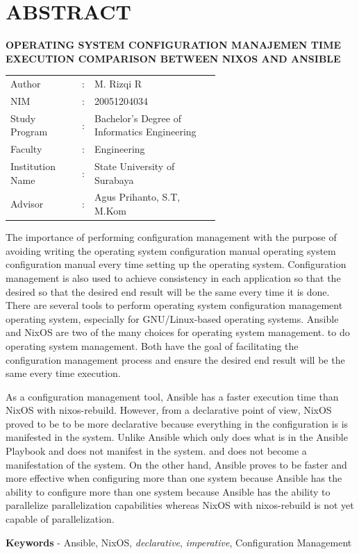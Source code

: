 \documentclass[10pt,twoside]{report}
\begin{document}
\chapter*{ABSTRACT}
\begin{adjustwidth}{0.0cm}{}
	\begin{center}
		\textbf{OPERATING SYSTEM CONFIGURATION MANAJEMEN TIME EXECUTION COMPARISON BETWEEN NIXOS AND ANSIBLE}
	\end{center}
	\medskip
	\begin{adjustwidth}{0.0cm}{}
		\begin{tabular}{@{}lcp{0.6\linewidth}}
			Author           & : & M. Rizqi R                                   \\
			NIM              & : & 20051204034                                  \\
			Study Program    & : & Bachelor's Degree of Informatics Engineering \\
			Faculty          & : & Engineering                                  \\
			Institution Name & : & State University of Surabaya                 \\
			Advisor          & : & Agus Prihanto, S.T, M.Kom                    \\
		\end{tabular}
	\end{adjustwidth}
	\medskip

	The importance of performing configuration management with the purpose of
	avoiding writing the operating system configuration manual operating system
	configuration manual every time setting up the operating system.
	Configuration management is also used to achieve consistency in each
	application so that the desired so that the desired end result will be the
	same every time it is done. There are several tools to perform operating
	system configuration management operating system, especially for
	GNU/Linux-based operating systems. Ansible and NixOS are two of the many
	choices for operating system management. to do operating system management.
	Both have the goal of facilitating the configuration management process and
	ensure the desired end result will be the same every time execution.

	As a configuration management tool, Ansible has a faster execution time than
	NixOS with nixos-rebuild. However, from a declarative point of view, NixOS
	proved to be to be more declarative because everything in the configuration
	is is manifested in the system. Unlike Ansible which only does what is in the
	Ansible Playbook and does not manifest in the system. and does not become a
	manifestation of the system. On the other hand, Ansible proves to be faster
	and more effective when configuring more than one system because Ansible has
	the ability to configure more than one system because Ansible has the ability
	to parallelize parallelization capabilities whereas NixOS with nixos-rebuild
	is not yet capable of parallelization.

	\medskip

	\noindent\textbf{Keywords} - Ansible, NixOS, \textit{declarative}, \textit{imperative},
	Configuration Management
\end{adjustwidth}
\end{document}
